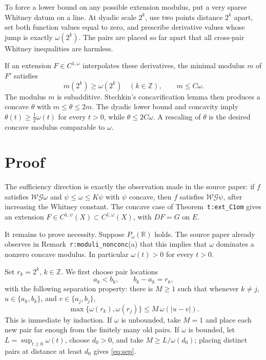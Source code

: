 \documentclass[11pt]{article}
\newcommand{\R}{\mathbb R}
\begin{document}
To force a lower bound on any possible extension modulus, put a very sparse
Whitney datum on a line.  At dyadic scale \(2^k\), use two points distance
\(2^k\) apart, set both function values equal to zero, and prescribe derivative
values whose jump is exactly \(\omega(2^k)\).  The pairs are placed so far
apart that all cross-pair Whitney inequalities are harmless.

If an extension \(F\in C^{1,\omega}\) interpolates these derivatives, the
minimal modulus \(m\) of \(F'\) satisfies
\[
        m(2^k)\geq \omega(2^k)\quad(k\in\mathbb Z),
        \qquad     m\leq C\omega .
\]
The modulus \(m\) is subadditive.  Stechkin's concavification lemma then
produces a concave \(\theta\) with \(m\leq\theta\leq2m\).  The dyadic lower
bound and concavity imply \(\theta(t)\geq \frac12\omega(t)\) for every
\(t>0\), while \(\theta\leq2C\omega\).  A rescaling of \(\theta\) is the
desired concave modulus comparable to \(\omega\).

\section*{Proof}

The sufficiency direction is exactly the observation made in the source paper:
if \(f\) satisfies \(\mathcal{W G}\omega\) and
\(\psi\leq\omega\leq K\psi\) with \(\psi\) concave, then \(f\) satisfies
\(\mathcal{W G}\psi\), after increasing the Whitney constant.  The concave
case of Theorem~\texttt{t:ext\_C1om} gives an extension
\(F\in C^{1,\psi}(X)\subset C^{1,\omega}(X)\), with \(DF=G\) on \(E\).

It remains to prove necessity.  Suppose \(P_\omega(\R)\) holds.  The source paper
already observes in Remark~\texttt{r:moduli\_nonconc}(a) that this implies
that \(\omega\) dominates a nonzero concave modulus.  In particular
\(\omega(t)>0\) for every \(t>0\).

Set \(r_k=2^k\), \(k\in\mathbb Z\).  We first choose pair locations
\[
        a_k<b_k,\qquad b_k-a_k=r_k ,
\]
with the following separation property: there is \(M\geq1\) such that whenever
\(k\neq j\), \(u\in\{a_k,b_k\}\), and \(v\in\{a_j,b_j\}\),
\[
\label{eq:sep}
        \max\{\omega(r_k),\omega(r_j)\}\leq
        M\,\omega(|u-v|).
\tag{1}
\]
This is immediate by induction.  If \(\omega\) is unbounded, take \(M=1\) and
place each new pair far enough from the finitely many old pairs.  If
\(\omega\) is bounded, let \(L=\sup_{t\geq0}\omega(t)\), choose \(d_0>0\), and
take \(M\geq L/\omega(d_0)\); placing distinct pairs at distance at least
\(d_0\) gives \eqref{eq:sep}.
\end{document}
